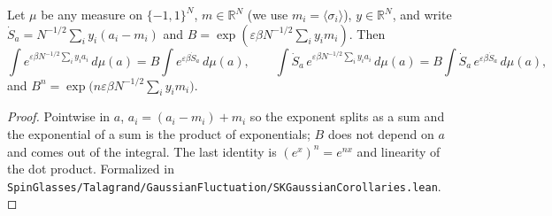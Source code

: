 \begin{lemma}
\label{lem:sg-tal:ising-split}
  \leanok
{}
Let $\mu$ be any measure on $\{-1,1\}^N$, $m\in\mathbb R^N$ (we use $m_i=\langle\sigma_i\rangle$), $y\in\mathbb R^N$, and write $\dot S_a=N^{-1/2}\sum_iy_i(a_i-m_i)$ and $B=\exp(\varepsilon\beta N^{-1/2}\sum_iy_im_i)$.  Then
\[
\int e^{\varepsilon\beta N^{-1/2}\sum_iy_ia_i}\,d\mu(a)=B\int e^{\varepsilon\beta\dot S_a}\,d\mu(a),\qquad
\int\dot S_a\,e^{\varepsilon\beta N^{-1/2}\sum_iy_ia_i}\,d\mu(a)=B\int\dot S_a\,e^{\varepsilon\beta\dot S_a}\,d\mu(a),
\]
and $B^n=\exp\bigl(n\varepsilon\beta N^{-1/2}\sum_iy_im_i\bigr)$.
\end{lemma}
\begin{proof}
  \leanok
Pointwise in $a$, $a_i=(a_i-m_i)+m_i$ so the exponent splits as a sum and the exponential of a sum is the product of exponentials; $B$ does not depend on $a$ and comes out of the integral.
The last identity is $(e^x)^n=e^{nx}$ and linearity of the dot product.
Formalized in \texttt{SpinGlasses/Talagrand/GaussianFluctuation/SKGaussianCorollaries.lean}.
\end{proof}

